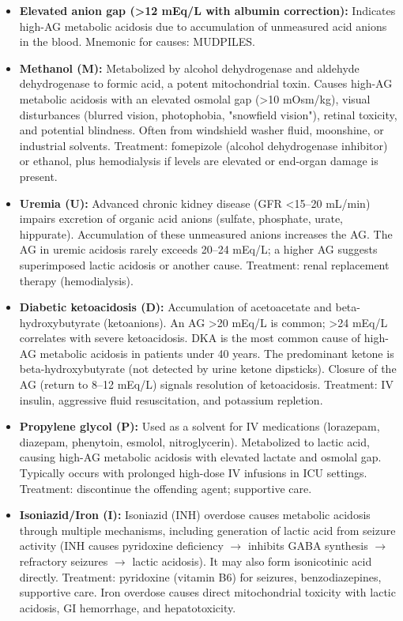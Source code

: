 \begin{itemize}
  \item \textbf{Elevated anion gap (>12 mEq/L with albumin correction):} Indicates high-AG metabolic acidosis due to accumulation of unmeasured acid anions in the blood. Mnemonic for causes: MUDPILES.
  \item \textbf{Methanol (M):} Metabolized by alcohol dehydrogenase and aldehyde dehydrogenase to formic acid, a potent mitochondrial toxin. Causes high-AG metabolic acidosis with an elevated osmolal gap (>10 mOsm/kg), visual disturbances (blurred vision, photophobia, "snowfield vision"), retinal toxicity, and potential blindness. Often from windshield washer fluid, moonshine, or industrial solvents. Treatment: fomepizole (alcohol dehydrogenase inhibitor) or ethanol, plus hemodialysis if levels are elevated or end-organ damage is present.
  \item \textbf{Uremia (U):} Advanced chronic kidney disease (GFR <15--20 mL/min) impairs excretion of organic acid anions (sulfate, phosphate, urate, hippurate). Accumulation of these unmeasured anions increases the AG. The AG in uremic acidosis rarely exceeds 20--24 mEq/L; a higher AG suggests superimposed lactic acidosis or another cause. Treatment: renal replacement therapy (hemodialysis).
  \item \textbf{Diabetic ketoacidosis (D):} Accumulation of acetoacetate and beta-hydroxybutyrate (ketoanions). An AG >20 mEq/L is common; >24 mEq/L correlates with severe ketoacidosis. DKA is the most common cause of high-AG metabolic acidosis in patients under 40 years. The predominant ketone is beta-hydroxybutyrate (not detected by urine ketone dipsticks). Closure of the AG (return to 8--12 mEq/L) signals resolution of ketoacidosis. Treatment: IV insulin, aggressive fluid resuscitation, and potassium repletion.
  \item \textbf{Propylene glycol (P):} Used as a solvent for IV medications (lorazepam, diazepam, phenytoin, esmolol, nitroglycerin). Metabolized to lactic acid, causing high-AG metabolic acidosis with elevated lactate and osmolal gap. Typically occurs with prolonged high-dose IV infusions in ICU settings. Treatment: discontinue the offending agent; supportive care.
  \item \textbf{Isoniazid/Iron (I):} Isoniazid (INH) overdose causes metabolic acidosis through multiple mechanisms, including generation of lactic acid from seizure activity (INH causes pyridoxine deficiency $\rightarrow$ inhibits GABA synthesis $\rightarrow$ refractory seizures $\rightarrow$ lactic acidosis). It may also form isonicotinic acid directly. Treatment: pyridoxine (vitamin B6) for seizures, benzodiazepines, supportive care. Iron overdose causes direct mitochondrial toxicity with lactic acidosis, GI hemorrhage, and hepatotoxicity.

\end{itemize}
